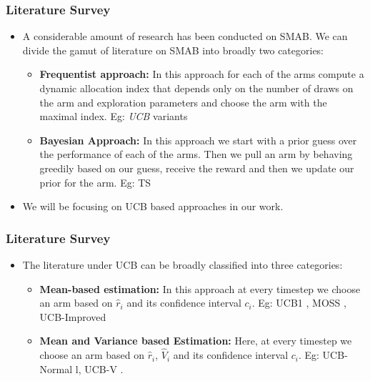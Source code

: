 \begin{frame}
\frametitle{Literature Survey}
\begin{itemize}
\item<1-> A considerable amount of research has been conducted on SMAB. We can divide the gamut of literature on SMAB into broadly two categories:
\begin{itemize}
\item<2-> \textbf{Frequentist approach:} In this approach for each of the arms compute a dynamic allocation index that depends only on the number of draws on the arm and exploration parameters and choose the arm with the maximal index. Eg:  \emph{UCB} variants
\item<3-> \textbf{Bayesian Approach:} In this approach we start with a prior guess over the performance of each of the arms. Then we pull an arm by behaving greedily based on our guess, receive the reward and then we update our prior for the arm. Eg: TS 
\end{itemize} 
\item<4-> We will be focusing on UCB based approaches in our work.
\end{itemize}
\end{frame}

\begin{frame}
\frametitle{Literature Survey}
\begin{itemize}
\item<1-> The literature under UCB can be broadly classified into three categories:
\begin{itemize}
\item<2-> \textbf{Mean-based estimation: } In this approach at every timestep we choose an arm based on $\hat{r}_i$ and its confidence interval $c_i$. Eg: UCB1 \cite{auer2002finite}, MOSS \cite{audibert2009minimax}, UCB-Improved \cite{auer2010ucb}
\item<3-> \textbf{Mean and Variance based Estimation: } Here, at every timestep we choose an arm based on $\hat{r}_i$, $\hat{V}_i$ and its confidence interval $c_i$. Eg: UCB-Normal \cite{auer2002finite}l, UCB-V \cite{audibert2009exploration}.
\end{itemize}
\end{itemize} 
\end{frame}

